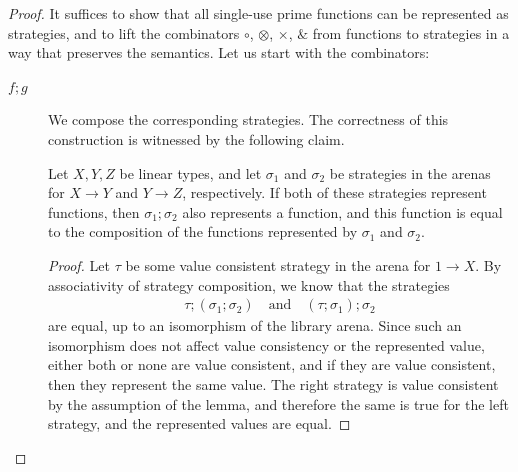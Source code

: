 \documentclass[10pt,a4paper]{amsart}
\numberwithin{equation}{section}
\theoremstyle{plain}
\begin{document}
\begin{proof}
    It suffices to show that all single-use prime functions can be represented as strategies,
    and  to lift the combinators $\circ$, $\otimes$, $\times$, $\&$ from functions to 
    strategies in a way that preserves the semantics. Let us start with the combinators:
    \begin{description}
        \item[$f; g$] We compose the corresponding strategies. The correctness of this construction is witnessed by the following claim. 
\begin{claim}\label{claim:composition-of-strategies-and-functions}    Let $X, Y, Z$ be linear types, and 
    let $\sigma_1$ and $\sigma_2$ be strategies in the arenas for $X \to Y$ and $Y \to Z$, respectively. If both of these strategies represent functions, then  $\sigma_1;\sigma_2$ also represents a function, and this function is equal to the composition of the functions represented by $\sigma_1$ and $\sigma_2$.
\end{claim}
\begin{proof}
    Let $\tau$ be some value consistent strategy in the arena for $1 \to X$. By associativity of strategy composition, we know that the strategies 
    \begin{align*}
    \tau;(\sigma_1;\sigma_2) \quad \text{and} \quad (\tau;\sigma_1);\sigma_2
    \end{align*}
    are equal, up to an isomorphism of the library arena. Since such an isomorphism does not affect value consistency or the represented value, either both or none are value consistent, and if they are value consistent, then they represent the same value. The right strategy is value consistent by the assumption of the lemma, and therefore the same is true for the left strategy, and the represented values are equal.
\end{proof}



\end{description}
\end{proof}
\end{document}
